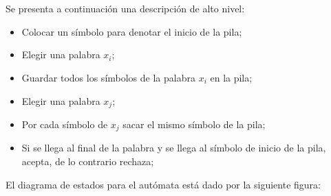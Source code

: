 \documentclass[spanish]{article}
\begin{document}
\\\\
Se presenta a continuación una descripción de alto nivel:
\begin{itemize}
\item Colocar un símbolo para denotar el inicio de la pila;
\item Elegir una palabra $x_i$;
\item Guardar todos los símbolos de la palabra $x_i$ en la pila;
\item Elegir una palabra $x_j$;
\item Por cada símbolo de $x_j$ sacar el mismo símbolo de la pila;
\item Si se llega al final de la palabra y se llega al símbolo de inicio de la pila, acepta, de lo contrario rechaza;
\end{itemize}
El diagrama de estados para el autómata está dado por la siguiente figura:
\end{document}
